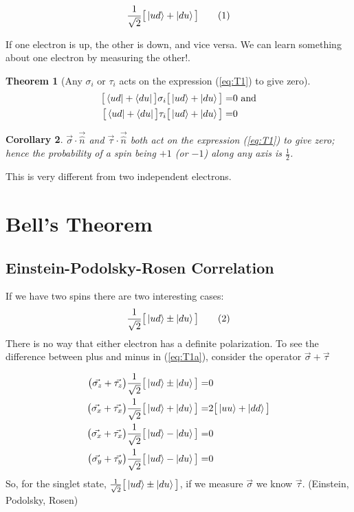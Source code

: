 \documentclass[]{article}
\newcommand\numberthis{\addtocounter{equation}{1}\tag{\theequation}}
\newtheorem{thm}{Theorem}
\newtheorem{cor}[thm]{Corollary}
\begin{document}
\begin{align*}
	\frac{1}{\sqrt{2}}\big[\ket{ud}+\ket{du}\big] \numberthis \label{eq:T1}
\end{align*}

If one electron is up, the other is down, and vice versa. We can learn something about one electron by measuring the other!.

\begin{thm}[Any $\sigma_i$ or $\tau_i$ acts on the expression (\ref{eq:T1}) to give zero]
	\begin{align*}
		\big[\bra{ud}+\bra{du}\big]\sigma_i\big[\ket{ud}+\ket{du}\big]=&0 \text{ and}\\
		\big[\bra{ud}+\bra{du}\big]\tau_i\big[\ket{ud}+\ket{du}\big]=&0
	\end{align*}
\end{thm}

\begin{cor}
	$\vec{\sigma}\cdot\vec{\hat{n}}$ and $\vec{\tau}\cdot\vec{\hat{n}}$ both  act on the expression (\ref{eq:T1}) to give zero; hence the probability of a spin being $+1$ (or $-1$) along any axis is $\frac{1}{2}$.
\end{cor}

This is very different from two independent electrons.

\section{Bell's Theorem}

\subsection{Einstein-Podolsky-Rosen Correlation}

If we have two spins there are two interesting cases:
\begin{align*}
	\frac{1}{\sqrt{2}}\big[\ket{ud}\pm\ket{du}\big] \numberthis \label{eq:T1a}
\end{align*}
There is no way that either electron has a definite polarization. To see the difference between plus and minus in (\ref{eq:T1a}), consider the operator $\vec{\sigma} + \vec{\tau}$

\begin{align*}
\big(\vec{\sigma_z} + \vec{\tau_z}\big)\frac{1}{\sqrt{2}}\big[\ket{ud}\pm\ket{du}\big]=& 0\\
\big(\vec{\sigma_x} + \vec{\tau_x}\big)\frac{1}{\sqrt{2}}\big[\ket{ud}+\ket{du}\big]=& 2 \big[\ket{uu}+\ket{dd}\big]\\
\big(\vec{\sigma_x} + \vec{\tau_x}\big)\frac{1}{\sqrt{2}}\big[\ket{ud}-\ket{du}\big]=& 0\\
\big(\vec{\sigma_y} + \vec{\tau_y}\big)\frac{1}{\sqrt{2}}\big[\ket{ud}-\ket{du}\big]=& 0
\end{align*}
So, for the singlet state, $\frac{1}{\sqrt{2}}\big[\ket{ud}\pm\ket{du}\big]$, if we measure $\vec{\sigma}$ we know $\vec{\tau}$. (Einstein, Podolsky, Rosen)
\end{document}
